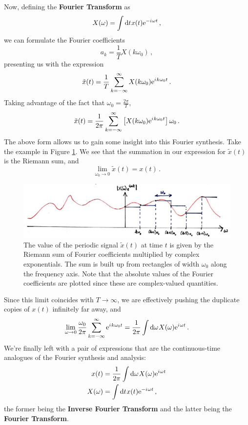 %
Now, defining the \textbf{Fourier Transform} as
%
\begin{equation}
  X(\omega) = \int \mathrm{d}t\mkern1mu x(t)\mathrm{e}^{-{i\mkern1mu}\omega t} \,,
\end{equation}
%
we can formulate the Fourier coefficients
%
\begin{displaymath}
  a_k = \frac{1}{T} X(k\omega_0) \,,
\end{displaymath}
%
presenting us with the expression
%
\begin{displaymath}
  \tilde{x}(t) = \frac{1}{T}\sum_{k=-\infty}^\infty X(k\omega_0)\mathrm{e}^{{i\mkern1mu} k\omega_0 t} \,.
\end{displaymath}
%
Taking advantage of the fact that $\omega_0 = \frac{2\pi}{T}$,
%
\begin{displaymath}
  \tilde{x}(t) = \frac{1}{2\pi}\sum_{k=-\infty}^\infty \left[X(k\omega_0)\mathrm{e}^{{i\mkern1mu} k\omega_0 t}\right]\omega_0 \,.
\end{displaymath}
%
The above form allows us to gain some insight into this Fourier synthesis.
Take the example in Figure \ref{fig::lecture_5_riemann}. We see that the summation in our expression for
$\tilde{x}(t)$ is the Riemann sum, and
%
\begin{displaymath}
  \lim_{\omega_0\rightarrow 0}\tilde{x}(t) = x(t) \,.
\end{displaymath}
%
\begin{figure}[!htb]
  \includegraphics[width=\textwidth]{images/lecture_5_riemann.JPG}
  \caption{
    The value of the periodic signal $\tilde{x}(t)$ at time $t$ is given by the Riemann
    sum of Fourier coefficients multiplied by complex exponentials. The sum is built up
    from rectangles of width $\omega_0$ along the frequency axis. Note that the absolute
    values of the Fourier coefficients are plotted since these are complex-valued quantities.
  }
  \label{fig::lecture_5_riemann}
\end{figure}
%
Since this limit coincides with $T\rightarrow\infty$, we are effectively
pushing the duplicate copies of $x(t)$ infinitely far away, and
%
\begin{displaymath}
  \lim_{\omega\rightarrow 0}\frac{\omega_0}{2\pi}\sum_{k=-\infty}^\infty \mathrm{e}^{{i\mkern1mu} k\omega_0 t}
  = \frac{1}{2\pi}\int\mathrm{d}\omega\mkern1muX(\omega)\mathrm{e}^{{i\mkern1mu}\omega t} \,.
\end{displaymath}
%
We're finally left with a pair of expressions that are the continuous-time
analogues of the Fourier synthesis and analysis:
%
\begin{align}
  x(t) &= \frac{1}{2\pi}\int\mathrm{d}\omega\mkern1mu X(\omega)\mathrm{e}^{{i\mkern1mu}\omega t} \\
  X(\omega) &= \int\mathrm{d}t\mkern1mu x(t)\mathrm{e}^{-{i\mkern1mu}\omega t} \,,
\end{align}
%
the former being the \textbf{Inverse Fourier Transform} and the latter being
the \textbf{Fourier Transform}.

